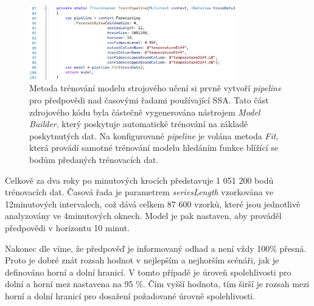 \begin{figure}[hbt]
\includegraphics[width=0.8\textwidth]{obrazky-figures/ml-pipeline.png}
\caption{Metoda trénování modelu strojového učení si prvně vytvoří {\it pipeline} pro předpovědi nad časovými řadami používající SSA. Tato část zdrojového kódu byla částečně vygenerována nástrojem {\it Model Builder}, který poskytuje automatické trénování na základě poskytnutých dat. Na konfigurované {\it pipeline} je volána metoda {\it Fit}, která provádí samotné trénování modelu hledáním funkce blížící se bodům předaných trénovacích dat.}
\end{figure}

Celkově za dva roky po minutových krocích představuje 1 051 200 bodů trénovacích dat. Časová řada je parametrem {\it seriesLength} vzorkována ve 12minutových intervalech, což dává celkem 87 600 vzorků, které jsou jednotlivě analyzovány ve 4minutových oknech. Model je pak nastaven, aby prováděl předpovědi v horizontu 10 minut. 

Nakonec dle \cite{mlnet_tutorial} víme, že předpověď je informovaný odhad a není vždy 100\% přesná. Proto je dobré znát rozsah hodnot v nejlepším a nejhorším scénáři, jak je definováno horní a dolní hranicí. V tomto případě je úroveň spolehlivosti pro dolní a horní mez nastavena na 95 \%. Čím vyšší hodnota, tím širší je rozsah mezi horní a dolní hranicí pro dosažení požadované úrovně spolehlivosti.

